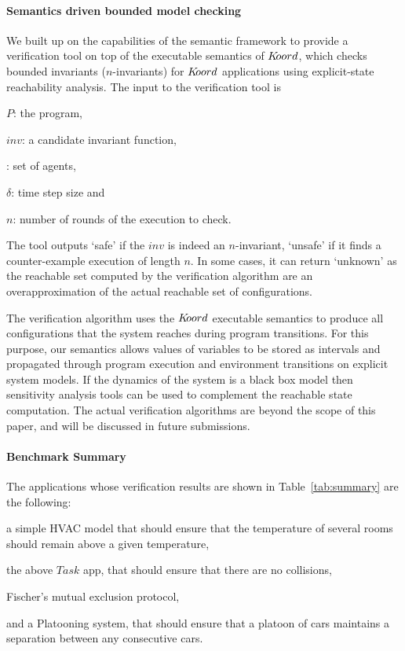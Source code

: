 \paragraph*{Semantics driven bounded model checking }
We built up on the capabilities of the \K semantic framework to provide a verification tool on top of the executable semantics of $K\kern-2pt oord$, which checks bounded invariants ($n$-invariants) for $K\kern-2pt oord$ applications using explicit-state reachability analysis. The input to the verification tool is 
\begin{inparaenum}[(i)] 
    \item $P$: the program, 
    \item $\mathit{inv}$: a candidate invariant function, 
    \item {\UINS}: set of agents, 
    \item $\delta$: time step size and 
    \item $n$: number of rounds of the execution to check.
\end{inparaenum}

The tool outputs `safe' if the $\mathit{inv}$ is indeed an $n$-invariant, `unsafe' if it finds a counter-example execution of length $n$. In some cases, it can return `unknown' as the reachable set computed by the verification algorithm are an overapproximation of the actual reachable set of configurations.  

The verification algorithm uses the $K\kern-2pt oord$ executable semantics to produce all configurations that the system reaches during program transitions. For this purpose, our semantics allows values of variables to be stored as intervals and propagated through program execution and environment transitions on explicit system models. If the dynamics of the system is a black box model then sensitivity analysis tools can be used to complement the reachable state computation. The actual verification algorithms are beyond the scope of this paper, and will be discussed in future submissions.

\paragraph*{Benchmark Summary}
The applications whose verification results are shown in Table~\ref{tab:summary} are the following:

\begin{inparaenum}[(i)]
\item a simple HVAC model that should ensure that the temperature of several rooms should remain above a  given temperature, 
\item  the above $\mathit{Task}$ app, that should ensure that there are no collisions, 
\item Fischer's mutual exclusion protocol, 
\item and a Platooning system, that should ensure that a platoon of cars maintains a separation between any consecutive cars. 
\end{inparaenum}

